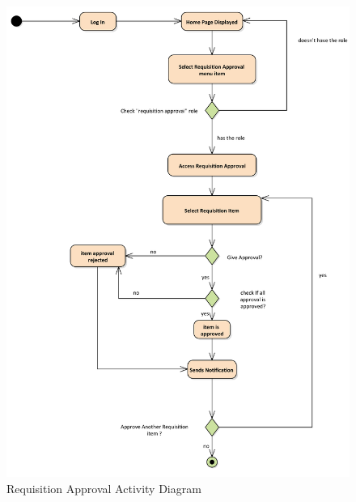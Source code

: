 \documentclass[12pt]{report} %
\begin{document}
\begin{figure}[h]
	\includegraphics[width=.9\textwidth]{pic/Activity/requisition_approval.png}
	\caption{Requisition Approval Activity Diagram}
	\label{fig:requisition_approval}
\end{figure}
\end{document}
